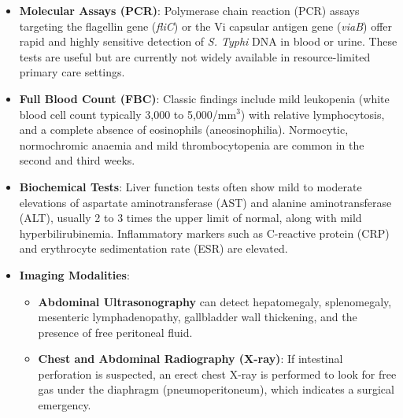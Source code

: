 \begin{itemize}
\begin{itemize}
    \item \textbf{Typhidot}: A rapid test that detects IgM and IgG antibodies against a specific 50 kDa outer membrane protein of \textit{S. Typhi}. IgM indicates acute infection, while IgG indicates past exposure. It is faster than culture, though it can have variable specificity in endemic regions.
  \end{itemize}
  \item \textbf{Molecular Assays (PCR)}: Polymerase chain reaction (PCR) assays targeting the flagellin gene (\textit{fliC}) or the Vi capsular antigen gene (\textit{viaB}) offer rapid and highly sensitive detection of \textit{S. Typhi} DNA in blood or urine. These tests are useful but are currently not widely available in resource-limited primary care settings.
  \item \textbf{Full Blood Count (FBC)}: Classic findings include mild leukopenia (white blood cell count typically 3,000 to 5,000/mm$^3$) with relative lymphocytosis, and a complete absence of eosinophils (aneosinophilia). Normocytic, normochromic anaemia and mild thrombocytopenia are common in the second and third weeks.
  \item \textbf{Biochemical Tests}: Liver function tests often show mild to moderate elevations of aspartate aminotransferase (AST) and alanine aminotransferase (ALT), usually 2 to 3 times the upper limit of normal, along with mild hyperbilirubinemia. Inflammatory markers such as C-reactive protein (CRP) and erythrocyte sedimentation rate (ESR) are elevated.
  \item \textbf{Imaging Modalities}:
  \begin{itemize}
    \item \textbf{Abdominal Ultrasonography} can detect hepatomegaly, splenomegaly, mesenteric lymphadenopathy, gallbladder wall thickening, and the presence of free peritoneal fluid.
    \item \textbf{Chest and Abdominal Radiography (X-ray)}: If intestinal perforation is suspected, an erect chest X-ray is performed to look for free gas under the diaphragm (pneumoperitoneum), which indicates a surgical emergency.
  \end{itemize}
\end{itemize}

